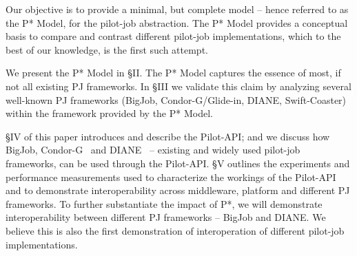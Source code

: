 \documentclass[conference,final]{IEEEtran}
\begin{document}



Our objective is to provide a minimal, but complete model -- hence
referred to as the P* Model, for the pilot-job abstraction.  The P*
Model provides a conceptual basis to compare and contrast different
pilot-job implementations, which to the best of our knowledge, is the
first such attempt.



We present the P* Model in \S{II}. The P* Model captures the essence
of most, if not all existing PJ frameworks. In \S{III} we validate
this claim by analyzing several well-known PJ frameworks
(BigJob, Condor-G/Glide-in, DIANE, Swift-Coaster) within the framework
provided by the P* Model.



\S{IV} of this paper introduces and describe the Pilot-API; and we
discuss how BigJob, Condor-G~\cite{condor-g} and
DIANE~\cite{Moscicki:908910} -- existing and widely used pilot-job
frameworks, can be used through the Pilot-API.  \S{V} outlines the
experiments and performance measurements used to characterize the
workings of the Pilot-API and to demonstrate interoperability across
middleware, platform and different PJ frameworks.  To further
substantiate the impact of P*, we will demonstrate interoperability
between different PJ frameworks -- BigJob and DIANE. We believe this
is also the first demonstration of interoperation of different
pilot-job implementations.
\end{document}
